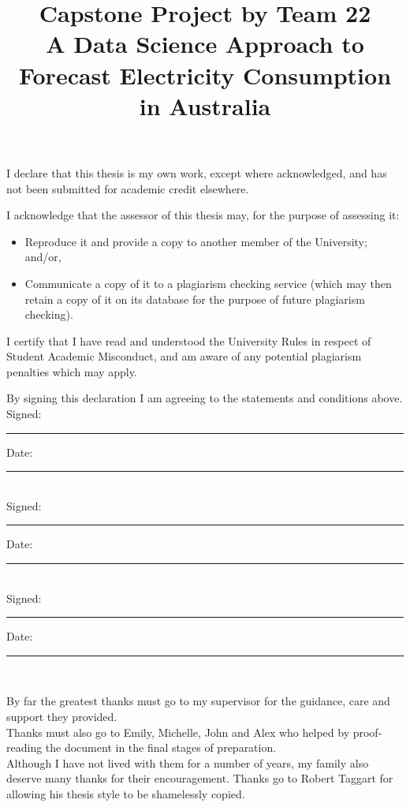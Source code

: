 \documentclass[mstat,12pt]{unswthesis}
\title{Capstone Project by Team 22\\[0.5cm]A Data Science Approach to Forecast Electricity Consumption in Australia}
\author{\Authornameonly}
\begin{document}
\beforepreface




\vskip 2pc \noindent I declare that this thesis is my
own work, except where acknowledged, and has not been submitted for
academic credit elsewhere. 

\vskip 2pc  \noindent I acknowledge that the assessor of this
thesis may, for the purpose of assessing it:
\begin{itemize}
\item Reproduce it and provide a copy to another member of the University; and/or,
\item Communicate a copy of it to a plagiarism checking service (which may then retain a copy of it on its database for the purpose of future plagiarism checking).
\end{itemize}

\vskip 2pc \noindent I certify that I have read and understood the University Rules in
respect of Student Academic Misconduct, and am aware of any potential plagiarism penalties which may 
apply.\vspace{24pt}

\vskip 2pc \noindent By signing 
this declaration I am
agreeing to the statements and conditions above.
\vskip 2pc \noindent
Signed: \rule{7cm}{0.25pt} \hfill Date: \rule{4cm}{0.25pt} \\[1cm]
Signed: \rule{7cm}{0.25pt} \hfill Date: \rule{4cm}{0.25pt} \\[1cm]
Signed: \rule{7cm}{0.25pt} \hfill Date: \rule{4cm}{0.25pt} \\[1cm]
\vskip 1pc





{\bigskip}By far the greatest thanks must go to my supervisor for the guidance,
care and support they provided.\\[1cm] Thanks must also go to Emily, Michelle, John and Alex who helped by
proof-reading the document in the final stages of preparation.\\[1cm] Although I have not lived with them for a number of years, my family
also deserve many thanks for their encouragement. Thanks go to Robert
Taggart for allowing his thesis style to be shamelessly copied.\\[1cm] 
\end{document}
